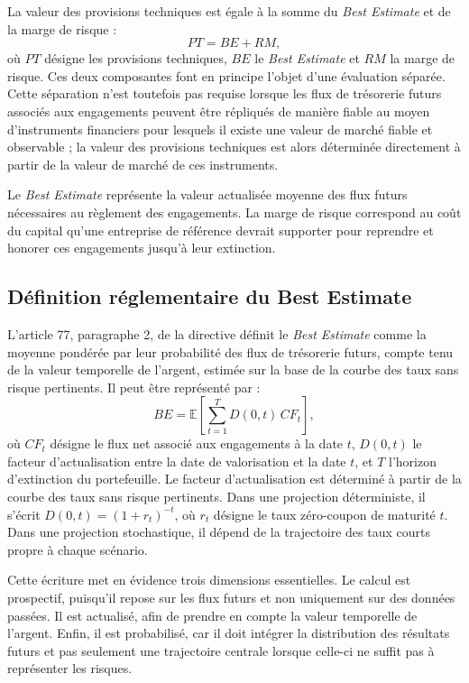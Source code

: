 La valeur des provisions techniques est égale à la somme du \textit{Best
Estimate} et de la marge de risque :
\[
    PT = BE + RM,
\]
où $PT$ désigne les provisions techniques, $BE$ le \textit{Best Estimate} et
$RM$ la marge de risque. Ces deux composantes font en principe l'objet d'une
évaluation séparée. Cette séparation n'est toutefois pas requise lorsque les
flux de trésorerie futurs associés aux engagements peuvent être répliqués de
manière fiable au moyen d'instruments financiers pour lesquels il existe une
valeur de marché fiable et observable ; la valeur des provisions techniques
est alors déterminée directement à partir de la valeur de marché de ces
instruments.

Le \textit{Best Estimate} représente la valeur actualisée moyenne des flux
futurs nécessaires au règlement des engagements. La marge de risque correspond
au coût du capital qu'une entreprise de référence devrait supporter pour
reprendre et honorer ces engagements jusqu'à leur extinction. 

\subsection{Définition réglementaire du Best Estimate}

L'article 77, paragraphe 2, de la directive définit le \textit{Best Estimate}
comme la moyenne pondérée par leur probabilité des flux de trésorerie futurs,
compte tenu de la valeur temporelle de l'argent, estimée sur la base de la
courbe des taux sans risque pertinents. Il peut être représenté par :
\[
    BE = \mathbb{E}\left[\sum_{t=1}^{T} D(0,t)\, CF_t\right],
\]
où $CF_t$ désigne le flux net associé aux engagements à la date $t$, $D(0,t)$
le facteur d'actualisation entre la date de valorisation et la date $t$, et
$T$ l'horizon d'extinction du portefeuille. Le facteur d'actualisation est
déterminé à partir de la courbe des taux sans risque pertinents. Dans une
projection déterministe, il s'écrit $D(0,t) = (1+r_t)^{-t}$, où $r_t$ désigne
le taux zéro-coupon de maturité $t$. Dans une projection stochastique, il
dépend de la trajectoire des taux courts propre à chaque scénario.

Cette écriture met en évidence trois dimensions essentielles. Le calcul est
prospectif, puisqu'il repose sur les flux futurs et non uniquement sur
des données passées. Il est actualisé, afin de prendre en compte la
valeur temporelle de l'argent. Enfin, il est probabilisé, car il doit
intégrer la distribution des résultats futurs et pas seulement une trajectoire
centrale lorsque celle-ci ne suffit pas à représenter les risques.

